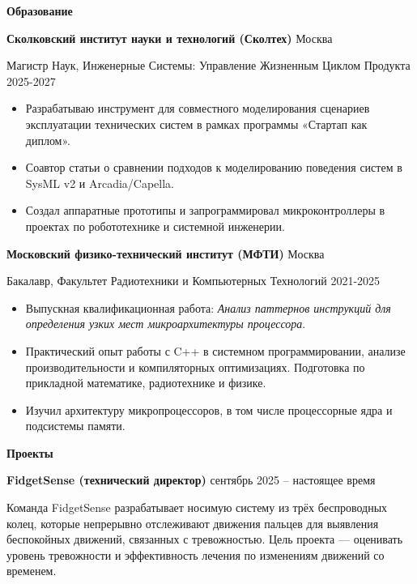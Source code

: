 \documentclass[11pt]{article}
\begin{document}
\vspace{6pt}

\begin{center}
  \textbf{Образование}
\end{center}

\textbf{Сколковский институт науки и технологий (Сколтех)} \hfill Москва

Магистр Наук, Инженерные Системы: Управление Жизненным Циклом Продукта \hfill 2025-2027
\begin{itemize}[noitemsep, topsep=0pt, partopsep=0pt, parsep=0pt]
  \item Разрабатываю инструмент для совместного моделирования сценариев эксплуатации технических систем в
    рамках программы «Стартап как диплом».
  \item Соавтор статьи о сравнении подходов к моделированию поведения систем в SysML v2 и Arcadia/Capella.
  \item Создал аппаратные прототипы и запрограммировал микроконтроллеры в проектах
    по робототехнике и системной инженерии.
\end{itemize}

\vspace{12pt}

\textbf{Московский физико-технический институт (МФТИ)} \hfill Москва

Бакалавр, Факультет Радиотехники и Компьютерных Технологий \hfill 2021-2025
\begin{itemize}[noitemsep, topsep=0pt, partopsep=0pt, parsep=0pt]
  \item Выпускная квалификационная работа: \textit{Анализ паттернов инструкций для определения
    узких мест микроархитектуры процессора}.
  \item Практический опыт работы с C++ в системном программировании, анализе производительности
    и компиляторных оптимизациях. Подготовка по прикладной математике, радиотехнике и физике.
  \item Изучил архитектуру микропроцессоров, в том числе процессорные ядра и подсистемы памяти.
\end{itemize}

\begin{center}
  \textbf{Проекты}
\end{center}

\textbf{FidgetSense (технический директор)} \hfill сентябрь 2025 – настоящее время

Команда FidgetSense разрабатывает носимую систему из трёх беспроводных колец, которые непрерывно
отслеживают движения пальцев для выявления беспокойных движений, связанных с тревожностью.
Цель проекта --- оценивать уровень тревожности и эффективность лечения по изменениям движений со временем.
\end{document}
